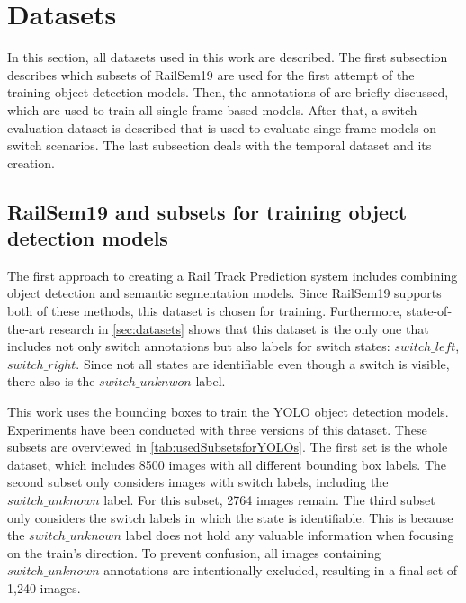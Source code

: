 \section{Datasets}
\label{sec:usedDatasets}

In this section, all datasets used in this work are described.
The first subsection describes which subsets of RailSem19 are used for the first attempt of the training object detection models.
Then, the annotations of \cite{tepNet2024} are briefly discussed, which are used to train all single-frame-based models.
After that, a switch evaluation dataset is described that is used to evaluate singe-frame models on switch scenarios.
The last subsection deals with the temporal dataset and its creation.


\subsection{RailSem19 and subsets for training object detection models}
\label{sec:usedDatasetsYOLOs}

The first approach to creating a Rail Track Prediction system includes combining object detection and semantic segmentation models.
Since RailSem19 supports both of these methods, this dataset is chosen for training.
Furthermore, state-of-the-art research in \autoref{sec:datasets} shows that this dataset is the only one that includes not only switch annotations but also labels for switch states: $switch\_left$, $switch\_right$.
Since not all states are identifiable even though a switch is visible, there also is the $switch\_unknwon$ label.

This work uses the bounding boxes to train the \ac{YOLO} object detection models.
Experiments have been conducted with three versions of this dataset.
These subsets are overviewed in \autoref{tab:usedSubsetsforYOLOs}.
The first set is the whole dataset, which includes 8500 images with all different bounding box labels.
The second subset only considers images with switch labels, including the $switch\_unknown$ label.
For this subset, 2764 images remain. The third subset only considers the switch labels in which the state is identifiable.
This is because the $switch\_unknown$ label does not hold any valuable information when focusing on the train's direction.
To prevent confusion, all images containing $switch\_unknown$ annotations are intentionally excluded, resulting in a final set of 1,240 images.

